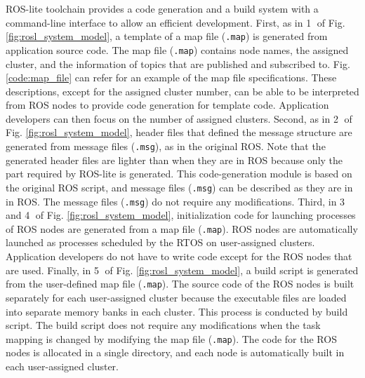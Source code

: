 ROS-lite toolchain provides a code generation and a build system with a command-line interface to allow an efficient development.
First, as in \textcircled{\scriptsize 1} of Fig. \ref{fig:rosl_system_model}, a template of a map file (\texttt{.map}) is generated from application source code.
The map file (\texttt{.map}) contains node names, the assigned cluster, and the information of topics that are published and subscribed to.
Fig. \ref{code:map_file} can refer for an example of the map file specifications.
These descriptions, except for the assigned cluster number, can be able to be interpreted from ROS nodes to provide code generation for template code.
Application developers can then focus on the number of assigned clusters.
Second, as in \textcircled{\scriptsize 2} of Fig. \ref{fig:rosl_system_model}, header files that defined the message structure are generated from message files (\texttt{.msg}), as in the original ROS.
Note that the generated header files are lighter than when they are in ROS because only the part required by ROS-lite is generated.
This code-generation module is based on the original ROS script, and message files (\texttt{.msg}) can be described as they are in in ROS.
The message files (\texttt{.msg}) do not require any modifications.
Third, in \textcircled{\scriptsize 3} and \textcircled{\scriptsize 4} of Fig. \ref{fig:rosl_system_model}, initialization code for launching processes of ROS nodes are generated from a map file (\texttt{.map}).
ROS nodes are automatically launched as processes scheduled by the RTOS on user-assigned clusters.
Application developers do not have to write code except for the ROS nodes that are used.
Finally, in \textcircled{\scriptsize 5} of Fig. \ref{fig:rosl_system_model}, a build script is generated from the user-defined map file (\texttt{.map}).
The source code of the ROS nodes is built separately for each user-assigned cluster because the executable files are loaded into separate memory banks in each cluster.
This process is conducted by build script.
The build script does not require any modifications when the task mapping is changed by modifying the map file (\texttt{.map}).
The code for the ROS nodes is allocated in a single directory, and each node is automatically built in each user-assigned cluster.

